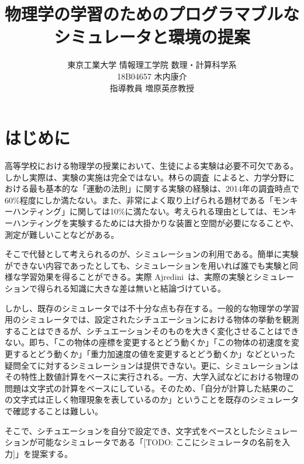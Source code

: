 \documentclass[11pt, a4paper, oneside, twocolumn]{jsarticle}
\title{物理学の学習のためのプログラマブルな
\\シミュレータと環境の提案}
\author{東京工業大学 情報理工学院 数理・計算科学系\\18B04657 木内康介\\指導教員 増原英彦教授}
\date{}
\newcommand{\simname}{[TODO: ここにシミュレータの名前を入力]}
\begin{document}
\maketitle

\section{はじめに}
高等学校における物理学の授業において、生徒による実験は必要不可欠である。しかし実際は、実験の実施は完全ではない。林らの調査~\cite{2015KJ00010038066}によると、力学分野における最も基本的な「運動の法則」に関する実験の経験は、2014年の調査時点で60\%程度にしか満たない。また、非常によく取り上げられる題材である「モンキーハンティング」に関しては10\%に満たない。考えられる理由としては、モンキーハンティングを実験するためには大掛かりな装置と空間が必要になることや、測定が難しいことなどがある。

そこで代替として考えられるのが、シミュレーションの利用である。簡単に実験ができない内容であったとしても、シミュレーションを用いれば誰でも実験と同様な学習効果を得ることができる。実際 Ajredini~\cite{ajredini_real_2014}は、実際の実験とシミュレーションで得られる知識に大きな差は無いと結論づけている。

しかし、既存のシミュレータでは不十分な点も存在する。一般的な物理学の学習用のシミュレータでは、設定されたシチュエーションにおける物体の挙動を観測することはできるが、シチュエーションそのものを大きく変化させることはできない。即ち、「この物体の座標を変更するとどう動くか」「この物体の初速度を変更するとどう動くか」「重力加速度の値を変更するとどう動くか」などといった疑問全てに対するシミュレーションは提供できない。更に、シミュレーションはその特性上数値計算をベースに実行される。一方、大学入試などにおける物理の問題は文字式の計算をベースにしている。そのため、「自分が計算した結果のこの文字式は正しく物理現象を表しているのか」ということを既存のシミュレータで確認することは難しい。

そこで、シチュエーションを自分で設定でき、文字式をベースとしたシミュレーションが可能なシミュレータである「\simname」を提案する。



\end{document}
